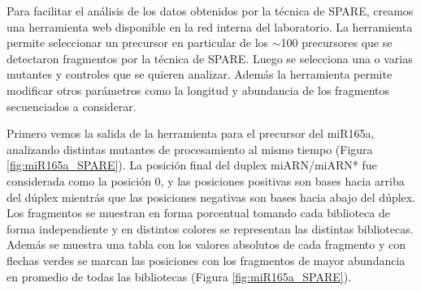


Para facilitar el análisis de los datos obtenidos por la técnica de SPARE, creamos una herramienta web disponible en la red interna del laboratorio.
La herramienta permite seleccionar un precursor en particular de los $\sim$100 precursores que se detectaron fragmentos por la técnica de SPARE.
Luego se selecciona una o varias mutantes y controles que se quieren analizar.
Además la herramienta permite modificar otros parámetros como la longitud y abundancia de los fragmentos secuenciados a considerar.

Primero vemos la salida de la herramienta para el precursor del  miR165a, analizando distintas mutantes de procesamiento al mismo tiempo (Figura \ref{fig:miR165a_SPARE}).
La posición final del duplex miARN/miARN* fue considerada como la posición 0, y las posiciones positivas son bases hacia arriba del dúplex mientrás que las posiciones negativas son bases hacia abajo del dúplex.
Los fragmentos se muestran en forma porcentual tomando cada biblioteca de forma independiente y en distintos colores se representan las distintas bibliotecas.
Además se muestra una tabla con los valores absolutos de cada fragmento y con flechas verdes se marcan las posiciones con los fragmentos de mayor abundancia en promedio de todas las bibliotecas (Figura \ref{fig:miR165a_SPARE}).
 
